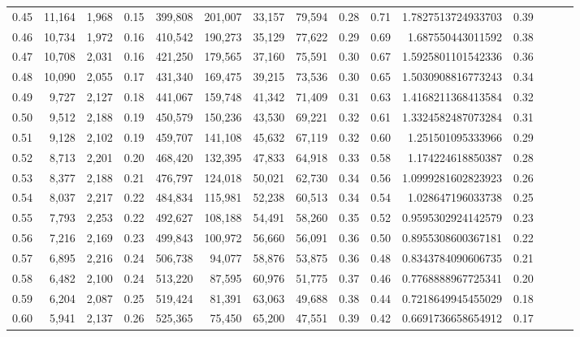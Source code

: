 \begin{tabular}{rrrrrrrrrrrrrrr}
0.45 &  11,164 &  1,968 &  0.15 &  399,808 &  201,007 &   33,157 &   79,594 &  0.28 &  0.71 &    1.7827513724933703 &      0.39 \\
0.46 &  10,734 &  1,972 &  0.16 &  410,542 &  190,273 &   35,129 &   77,622 &  0.29 &  0.69 &     1.687550443011592 &      0.38 \\
0.47 &  10,708 &  2,031 &  0.16 &  421,250 &  179,565 &   37,160 &   75,591 &  0.30 &  0.67 &    1.5925801101542336 &      0.36 \\
0.48 &  10,090 &  2,055 &  0.17 &  431,340 &  169,475 &   39,215 &   73,536 &  0.30 &  0.65 &    1.5030908816773243 &      0.34 \\
0.49 &   9,727 &  2,127 &  0.18 &  441,067 &  159,748 &   41,342 &   71,409 &  0.31 &  0.63 &    1.4168211368413584 &      0.32 \\
0.50 &   9,512 &  2,188 &  0.19 &  450,579 &  150,236 &   43,530 &   69,221 &  0.32 &  0.61 &    1.3324582487073284 &      0.31 \\
0.51 &   9,128 &  2,102 &  0.19 &  459,707 &  141,108 &   45,632 &   67,119 &  0.32 &  0.60 &     1.251501095333966 &      0.29 \\
0.52 &   8,713 &  2,201 &  0.20 &  468,420 &  132,395 &   47,833 &   64,918 &  0.33 &  0.58 &     1.174224618850387 &      0.28 \\
0.53 &   8,377 &  2,188 &  0.21 &  476,797 &  124,018 &   50,021 &   62,730 &  0.34 &  0.56 &    1.0999281602823923 &      0.26 \\
0.54 &   8,037 &  2,217 &  0.22 &  484,834 &  115,981 &   52,238 &   60,513 &  0.34 &  0.54 &     1.028647196033738 &      0.25 \\
0.55 &   7,793 &  2,253 &  0.22 &  492,627 &  108,188 &   54,491 &   58,260 &  0.35 &  0.52 &    0.9595302924142579 &      0.23 \\
0.56 &   7,216 &  2,169 &  0.23 &  499,843 &  100,972 &   56,660 &   56,091 &  0.36 &  0.50 &    0.8955308600367181 &      0.22 \\
0.57 &   6,895 &  2,216 &  0.24 &  506,738 &   94,077 &   58,876 &   53,875 &  0.36 &  0.48 &    0.8343784090606735 &      0.21 \\
0.58 &   6,482 &  2,100 &  0.24 &  513,220 &   87,595 &   60,976 &   51,775 &  0.37 &  0.46 &    0.7768888967725341 &      0.20 \\
0.59 &   6,204 &  2,087 &  0.25 &  519,424 &   81,391 &   63,063 &   49,688 &  0.38 &  0.44 &    0.7218649945455029 &      0.18 \\
0.60 &   5,941 &  2,137 &  0.26 &  525,365 &   75,450 &   65,200 &   47,551 &  0.39 &  0.42 &    0.6691736658654912 &      0.17 \\

\end{tabular}
